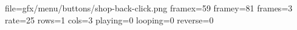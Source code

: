 file=gfx/menu/buttons/shop-back-click.png
framex=59
framey=81
frames=3
rate=25
rows=1
cols=3
playing=0
looping=0
reverse=0